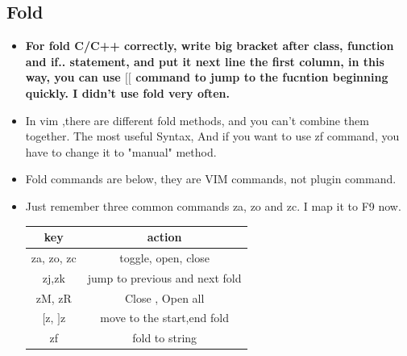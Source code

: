 \documentclass[paper=8.5in:11in, twoside, 12pt, pagesize=pdftex]{book}
\begin{document}
				\subsection{Fold}
				\begin{itemize}
					
					\item \textbf{For fold C/C++ correctly, write big bracket after class, function and if.. statement, and put it next line the first column, in this way, you can use $[[$ command to jump to the fucntion beginning quickly. I didn't use fold very often.}
					
					\item In vim ,there are different fold methods, and you can't combine them together.  The most useful Syntax, And if you want to use zf command, you have to change it to "manual" method. 
					
					\item Fold commands are below, they are VIM commands, not plugin command.
					
					\item Just remember three common commands za, zo and zc. I map it to F9 now. 
					
					\begin{tabular}{|c|c|}
						\hline 
						\textbf{key} & \textbf{action} \\ 
						\hline 
						za, zo, zc & toggle, open, close \\ 
						\hline 
						zj,zk  & jump to previous and next fold\\ 
						\hline
						zM, zR & Close , Open all \\
						\hline 
						$[$z, $]$z & move to the start,end fold \\
						\hline 
						zf\string & fold to string \\
						\hline 
					\end{tabular} 
					
				\end{itemize}
				
\end{document}
